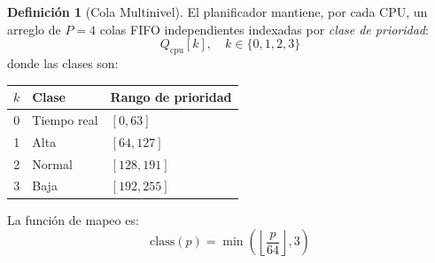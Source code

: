 \documentclass[11pt,twoside,openright]{book}
\theoremstyle{definition}
\newtheorem{definition}{Definición}[chapter]
\theoremstyle{plain}
\theoremstyle{remark}
\begin{document}
\begin{definition}[Cola Multinivel]
\label{def:mlq}
El planificador mantiene, por cada CPU, un arreglo de $P = 4$ colas FIFO independientes
indexadas por \emph{clase de prioridad}:
\[
    Q_{\text{cpu}}[k], \quad k \in \{0, 1, 2, 3\}
\]
donde las clases son:
\begin{center}
\begin{tabular}{cll}
\toprule
$k$ & \textbf{Clase} & \textbf{Rango de prioridad} \\
\midrule
0 & Tiempo real  & $[0, 63]$ \\
1 & Alta         & $[64, 127]$ \\
2 & Normal       & $[128, 191]$ \\
3 & Baja         & $[192, 255]$ \\
\bottomrule
\end{tabular}
\end{center}
\end{definition}

La función de mapeo es:
\[
    \text{class}(p) = \min\left(\left\lfloor \frac{p}{64} \right\rfloor, 3\right)
\]
\end{document}
